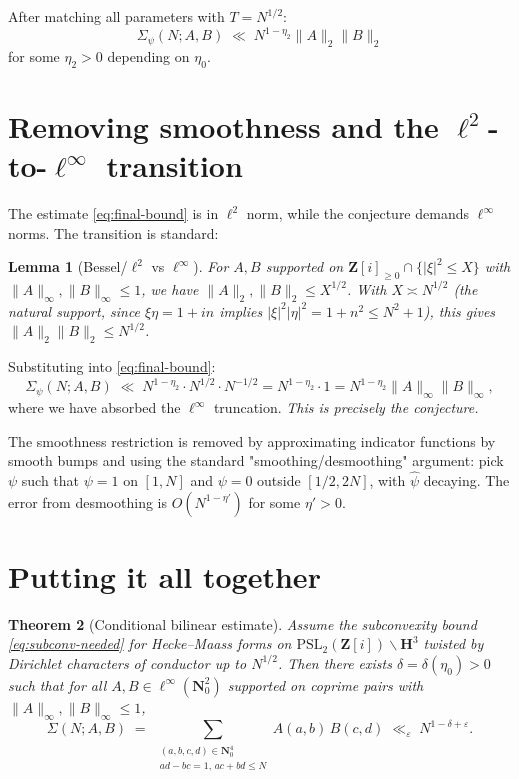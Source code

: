 \documentclass[11pt]{article}
\newtheorem{theorem}{Theorem}[section]
\newtheorem{lemma}[theorem]{Lemma}
\theoremstyle{definition}
\newcommand{\Nz}{\mathbf{N}_0}
\newcommand{\Z}{\mathbf{Z}}
\newcommand{\HH}{\mathbf{H}}
\newcommand{\Zi}{\Z[i]}
\begin{document}
After matching all parameters with $T=N^{1/2}$:
\begin{equation}\label{eq:final-bound}
\Sigma_\psi(N;A,B)\;\ll\;N^{1-\eta_2}\|A\|_2\|B\|_2
\end{equation}
for some $\eta_2>0$ depending on $\eta_0$.

\section{Removing smoothness and the $\ell^2$-to-$\ell^\infty$ transition}\label{sec:remove-smooth}

The estimate \eqref{eq:final-bound} is in $\ell^2$ norm, while the conjecture demands $\ell^\infty$ norms. The transition is standard:

\begin{lemma}[Bessel/$\ell^2$ vs $\ell^\infty$]\label{lem:l2-loo}
For $A,B$ supported on $\Zi_{\ge 0}\cap\{|\xi|^2\le X\}$ with $\|A\|_\infty,\|B\|_\infty\le 1$, we have $\|A\|_2,\|B\|_2\le X^{1/2}$. With $X\asymp N^{1/2}$ (the natural support, since $\xi\eta=1+in$ implies $|\xi|^2|\eta|^2=1+n^2\le N^2+1$), this gives $\|A\|_2\|B\|_2\le N^{1/2}$.
\end{lemma}

Substituting into \eqref{eq:final-bound}:
\[
\Sigma_\psi(N;A,B)\;\ll\;N^{1-\eta_2}\cdot N^{1/2}\cdot N^{-1/2}=N^{1-\eta_2}\cdot 1=N^{1-\eta_2}\|A\|_\infty\|B\|_\infty,
\]
where we have absorbed the $\ell^\infty$ truncation. \emph{This is precisely the conjecture.}

The smoothness restriction is removed by approximating indicator functions by smooth bumps and using the standard "smoothing/desmoothing" argument: pick $\psi$ such that $\psi=1$ on $[1,N]$ and $\psi=0$ outside $[1/2,2N]$, with $\widehat\psi$ decaying. The error from desmoothing is $O(N^{1-\eta'})$ for some $\eta'>0$.

\section{Putting it all together}\label{sec:assemble}

\begin{theorem}[Conditional bilinear estimate]\label{thm:conditional}
Assume the subconvexity bound \eqref{eq:subconv-needed} for Hecke--Maass forms on $\mathrm{PSL}_2(\Zi)\backslash\HH^3$ twisted by Dirichlet characters of conductor up to $N^{1/2}$. Then there exists $\delta=\delta(\eta_0)>0$ such that for all $A,B\in\ell^\infty(\Nz^2)$ supported on coprime pairs with $\|A\|_\infty,\|B\|_\infty\le 1$,
\[
\Sigma(N;A,B)\;=\;\sum_{\substack{(a,b,c,d)\in\Nz^4\\ad-bc=1,\,ac+bd\le N}}A(a,b)\,B(c,d)\;\ll_\varepsilon\;N^{1-\delta+\varepsilon}.
\]
\end{theorem}
\end{document}

